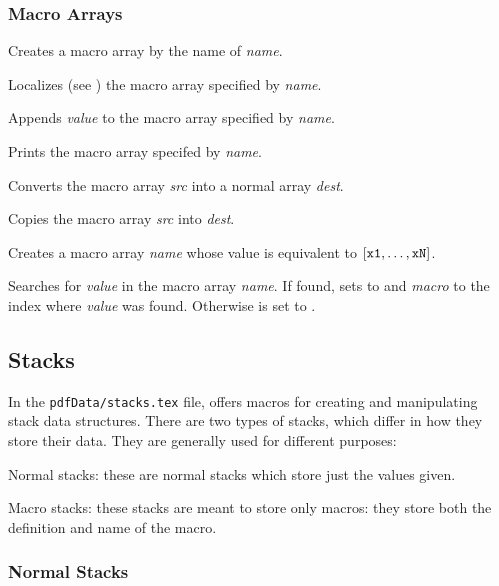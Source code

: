 \subsubsection{Macro Arrays}

Creates a macro array by the name of {\it name}.
\emacroexp

Localizes (see ) the macro array specified by {\it name}.
\emacroexp

Appends {\it value} to the macro array specified by {\it name}.
\emacroexp

Prints the macro array specifed by {\it name}.
\emacroexp

Converts the macro array {\it src} into a normal array {\it dest}.
\emacroexp

Copies the macro array {\it src} into {\it dest}.
\emacroexp

Creates a macro array {\it name} whose value is equivalent to $\tt[x1,\dots,xN]$.
\emacroexp

Searches for {\it value} in the macro array {\it name}.
If found, sets \macro\@return@value{} to \macro\True{} and {\it macro} to the index where {\it value} was found.
Otherwise \macro\@return@value{} is set to \macro\False.
\emacroexp

\subsection{Stacks}

In the {\tt pdfData/stacks.tex} file, \pdftoolbox{} offers macros for creating and manipulating stack data structures.
There are two types of stacks, which differ in how they store their data.
They are generally used for different purposes:

\blist
    \item Normal stacks: these are normal stacks which store just the values given.
    \item Macro stacks: these stacks are meant to store only macros: they store both the definition and name of the macro.
\elist

\subsubsection{Normal Stacks}

